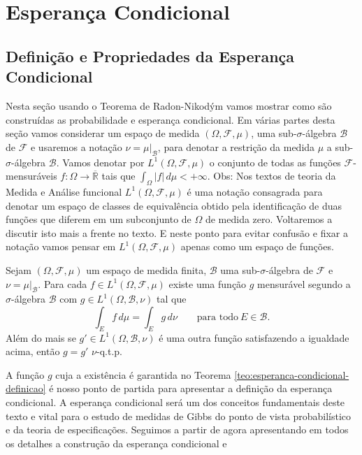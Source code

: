 \chapter[Aula 13]{Esperança Condicional}
\chaptermark{}


\section{Definição e Propriedades da Esperança Condicional} 
Nesta seção usando o Teorema de Radon-Nikodým vamos mostrar 
como são construídas as probabilidade e esperança 
condicional. 
Em várias partes desta seção vamos considerar 
um espaço de medida $(\Omega,\mathcal{F},\mu)$, uma sub-$\sigma$-álgebra 
$\mathcal{B}$ de $\mathcal{F}$ e usaremos a notação $\nu=\mu|_{\mathcal{B}}$, 
para denotar a restrição da medida $\mu$ a sub-$\sigma$-álgebra $\mathcal{B}$. Vamos denotar por
$L^1(\Omega,\mathcal{F},\mu)$ o conjunto de todas as funções $\mathcal{F}$-mensuráveis $f:\Omega\to\overline{\mathbb{R}}$ 
tais que $\int_{\Omega} |f|\, d\mu <+\infty$. Obs: Nos textos de teoria da Medida e Análise funcional
$L^1(\Omega,\mathcal{F},\mu)$ é uma notação consagrada para denotar um espaço de classes de equivalência obtido 
pela identificação de duas funções que diferem em um subconjunto de $\Omega$ de medida zero. Voltaremos a discutir isto mais a frente
no texto. E neste ponto para evitar confusão e fixar a notação vamos pensar em $L^1(\Omega,\mathcal{F},\mu)$ apenas como um espaço de funções.
\begin{teorema}\label{teo:esperanca-condicional-definicao} 
Sejam $(\Omega,\mathcal{F},\mu)$ um espaço de medida finita, $\mathcal{B}$ uma sub-$\sigma$-álgebra de $\mathcal{F}$ 
e $\nu=\mu|_{\mathcal{B}}$. Para cada $f\in L^1(\Omega,\mathcal{F},\mu)$ existe uma função $g$ mensurável segundo a 
$\sigma$-álgebra $\mathcal{B}$ com $g\in L^1(\Omega,\mathcal{B},\nu)$ tal que 
$$
\int_{E} f\, d\mu =\int_{E} g\, d\nu \qquad \text{para todo} \ E\in\mathcal{B}.
$$
Além do mais se $g'\in L^1(\Omega,\mathcal{B},\nu)$ é uma outra função satisfazendo a igualdade acima, 
então $g=g'$ $\nu$-q.t.p. 
\end{teorema}
A função $g$ cuja a existência é garantida no Teorema \eqref{teo:esperanca-condicional-definicao} é nosso ponto de partida para apresentar a definição da esperança condicional.
A esperança condicional será um dos conceitos fundamentais deste texto e vital para o estudo de medidas de Gibbs do ponto de vista probabilístico
e da teoria de especificações. Seguimos a partir de agora apresentando em todos os detalhes a construção da esperança condicional e 
